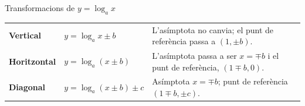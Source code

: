 \documentclass[11pt,a4paper]{article}
\begin{document}
\begin{fmprop}{Transformacions de $y=\log_ax$}
\begin{center}\renewcommand{\arraystretch}{1.5}\small\begin{tabularx}{\linewidth}{>{\raggedright\arraybackslash}p{3.2cm}>{\raggedright\arraybackslash}X>{\raggedright\arraybackslash}X}\toprule
\textbf{Vertical} & $y=\log_ax\pm b$ & L'asímptota no canvia; el punt de referència passa a $(1,\pm b)$.\\[3pt]
\textbf{Horitzontal} & $y=\log_a(x\pm b)$ & L'asímptota passa a ser $x=\mp b$ i el punt de referència, $(1\mp b,0)$.\\[3pt]
\textbf{Diagonal} & $y=\log_a(x\pm b)\pm c$ & Asímptota $x=\mp b$; punt de referència $(1\mp b,\pm c)$.\\[3pt]
\bottomrule\end{tabularx}\end{center}


\end{fmprop}
\end{document}

